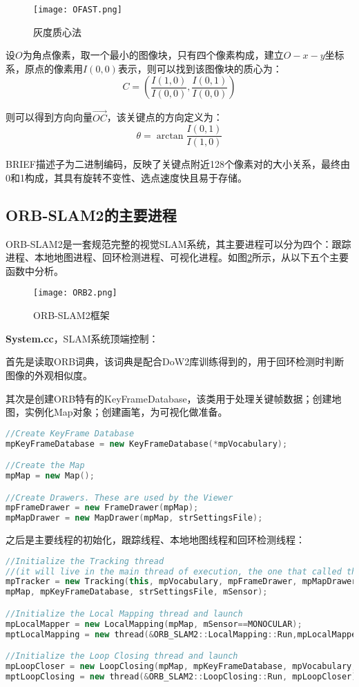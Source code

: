 \begin{figure}[!ht]
	\centering
	\texttt{[image: OFAST.png]}
	\caption{灰度质心法}
	\label{fig8}
\end{figure}

设$O$为角点像素，取一个最小的图像块，只有四个像素构成，建立$O-x-y$坐标系，原点的像素用$I(0,0)$表示，则可以找到该图像块的质心为：
$$
C=(\frac{I(1,0)}{I(0,0)}, \frac{I(0,1)}{I(0,0)})
$$

则可以得到方向向量$\vec{OC}$，该关键点的方向定义为：
$$
\theta = \arctan{\frac{I(0,1)}{I(1,0)}}
$$

BRIEF描述子为二进制编码，反映了关键点附近128个像素对的大小关系，最终由0和1构成，其具有旋转不变性、选点速度快且易于存储。

\subsection{ORB-SLAM2的主要进程} \label{3.2.2}

ORB-SLAM2是一套规范完整的视觉SLAM系统，其主要进程可以分为四个：跟踪进程、本地地图进程、回环检测进程、可视化进程。如图\ref{fig9}所示，从以下五个主要函数中分析。

\begin{figure}[!ht]
	\centering
	\texttt{[image: ORB2.png]}
	\caption{ORB-SLAM2框架}
	\label{fig9}
\end{figure}

\textbf{System.cc}，SLAM系统顶端控制：

首先是读取ORB词典，该词典是配合DoW2库训练得到的，用于回环检测时判断图像的外观相似度。

其次是创建ORB特有的KeyFrameDatabase，该类用于处理关键帧数据；创建地图，实例化Map对象；创建画笔，为可视化做准备。

\begin{lstlisting}[language={C++}]
//Create KeyFrame Database
mpKeyFrameDatabase = new KeyFrameDatabase(*mpVocabulary);

//Create the Map
mpMap = new Map();

//Create Drawers. These are used by the Viewer
mpFrameDrawer = new FrameDrawer(mpMap);
mpMapDrawer = new MapDrawer(mpMap, strSettingsFile);
\end{lstlisting}

之后是主要线程的初始化，跟踪线程、本地地图线程和回环检测线程：
\begin{lstlisting}[language={C++}]
//Initialize the Tracking thread
//(it will live in the main thread of execution, the one that called this constructor)
mpTracker = new Tracking(this, mpVocabulary, mpFrameDrawer, mpMapDrawer,
mpMap, mpKeyFrameDatabase, strSettingsFile, mSensor);

//Initialize the Local Mapping thread and launch
mpLocalMapper = new LocalMapping(mpMap, mSensor==MONOCULAR);
mptLocalMapping = new thread(&ORB_SLAM2::LocalMapping::Run,mpLocalMapper);

//Initialize the Loop Closing thread and launch
mpLoopCloser = new LoopClosing(mpMap, mpKeyFrameDatabase, mpVocabulary, mSensor!=MONOCULAR);
mptLoopClosing = new thread(&ORB_SLAM2::LoopClosing::Run, mpLoopCloser);
\end{lstlisting}

